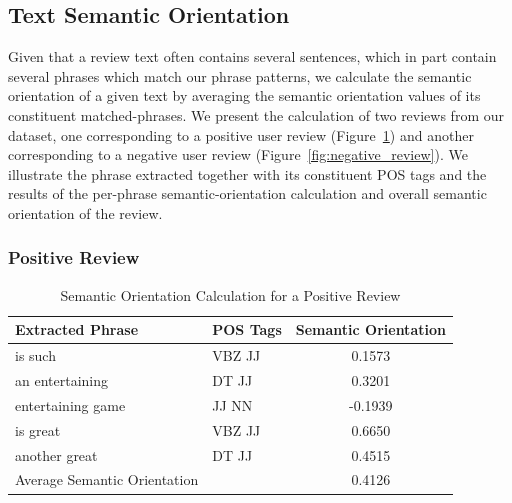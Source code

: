 \documentclass[11pt]{report} %
\begin{document}
\subsection{Text Semantic Orientation}
Given that a review text often contains several sentences, which in part contain several phrases which match our phrase patterns, we calculate the semantic orientation of a given text by averaging the semantic orientation values of its constituent matched-phrases. We present the calculation of two reviews from our dataset, one corresponding to a positive user review (Figure~\ref{fig:positive_review}) and another corresponding to a negative user review (Figure~\ref{fig:negative_review}). We illustrate the phrase extracted together with its constituent POS tags and the results of the per-phrase semantic-orientation calculation and overall semantic orientation of the review.

\pagebreak
\subsubsection{Positive Review}

\begin{table}[h!]
	\centering
    \begin{tabular}{  l  l  c}
    \hline\hline
    	 Extracted Phrase & POS Tags & Semantic Orientation \\ \hline
	is such & VBZ JJ & 0.1573 \\ \hline
	an entertaining & DT JJ & 0.3201 \\ \hline
	entertaining game & JJ NN & -0.1939 \\ \hline \hline
	is great & VBZ JJ & 0.6650 \\ \hline \hline
	another great & DT JJ & 0.4515 \\ \hline \hline
	Average Semantic Orientation & & 0.4126\\ \hline
    \hline
    \end{tabular}
\caption{Semantic Orientation Calculation for a Positive Review}
\label{fig:positive_review}
\end{table}
\end{document}
